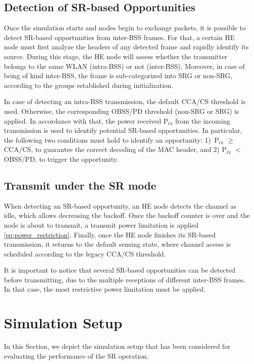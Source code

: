 \documentclass{article}
\begin{document}
	\subsection{Detection of SR-based Opportunities}
	
	Once the simulation starts and nodes begin to exchange packets, it is possible to detect SR-based opportunities from inter-BSS frames. For that, a certain HE node must first analyze the headers of any detected frame and rapidly identify its source. During this stage, the HE node will assess whether the transmitter belongs to the same WLAN (intra-BSS) or not (inter-BSS). Moreover, in case of being of kind inter-BSS, the frame is sub-categorized into SRG or non-SRG, according to the groups established during initialization.
	
	In case of detecting an intra-BSS transmission, the default CCA/CS threshold is used. Otherwise, the corresponding OBSS/PD threshold (non-SRG or SRG) is applied. In accordance with that, the power received P$_\text{rx}$ from the incoming transmission is used to identify potential SR-based opportunities. In particular, the following two conditions must hold to identify an opportunity: 1)~P$_\text{rx}$ $\geq$ CCA/CS, to guarantee the correct decoding of the MAC header, and 2) P$_\text{rx}$ $<$ OBSS/PD, to trigger the opportunity.
	
	\subsection{Transmit under the SR mode}
	When detecting an SR-based opportunity, an HE node detects the channel as idle, which allows decreasing the backoff. Once the backoff counter is over and the node is about to transmit, a transmit power limitation is applied \eqref{eq:power_restriction}. Finally, once the HE node finishes its SR-based transmission, it returns to the default sensing state, where channel access is scheduled according to the legacy CCA/CS threshold.
	
	It is important to notice that several SR-based opportunities can be detected before transmitting, due to the multiple receptions of different inter-BSS frames. In that case, the most restrictive power limitation must be applied. 
	
	\section{Simulation Setup}
	\label{section:simulation_setup}
	In this Section, we depict the simulation setup that has been considered for evaluating the performance of the SR operation.%
	
\end{document}
